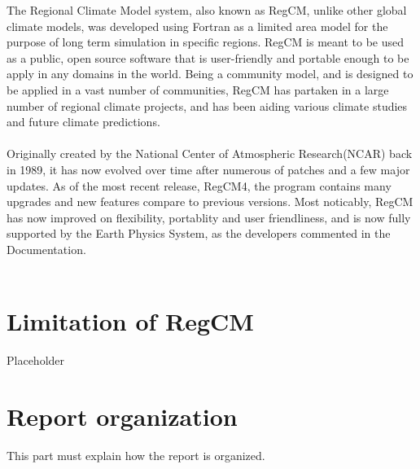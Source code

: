 The Regional Climate Model system, also known as RegCM, unlike other global climate models, was developed using Fortran as a limited area model for the purpose of long term simulation in specific regions. RegCM is meant to be used as a public, open source software that is user-friendly and portable enough to be apply in any domains in the world. Being a community model, and is designed to be applied in a vast number of communities, RegCM has partaken in a large number of regional climate projects, and has been aiding various climate studies and future climate predictions. \\
~\\
Originally created by the National Center of Atmospheric Research(NCAR) back in 1989, it has now evolved over time after numerous of patches and a few major updates. As of the most recent release, RegCM4, the program contains many upgrades and new features compare to previous versions. Most noticably, RegCM has now improved on flexibility, portablity and user friendliness, and is now fully supported by the Earth Physics System, as the developers commented in the Documentation. \\
~\\

\section{Limitation of RegCM}

\vspace*{1cm}
Placeholder

\section{Report organization}

This part must explain how the report is organized.
